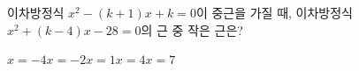이차방정식 $x^2-(k+1)x+k=0$이 중근을 가질 때, 이차방정식 $x^2+(k-4)x-28=0$의 근 중 작은 근은? 
\begin{choices32}{$x=-4$}{$x=-2$}{$x=1$}{$x=4$}{$x=7$}\end{choices32}
